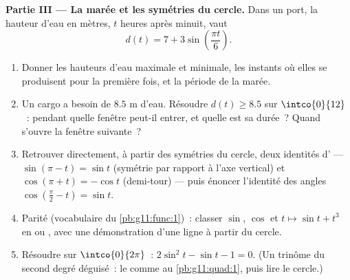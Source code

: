 \begin{problem}
\medskip
\noindent\textbf{Partie III --- La marée et les symétries du
cercle.}
Dans un port, la hauteur d'eau en mètres, $t$ heures après minuit,
vaut
\[
d(t) = 7 + 3 \sin\!\left(\frac{\pi t}{6}\right).
\]
\begin{enumerate}[resume]
  \item Donner les hauteurs d'eau maximale et minimale, les instants
        où elles se produisent pour la première fois, et la période
        de la marée.
  \item Un cargo a besoin de $8.5$ m d'eau. Résoudre
        $d(t) \geq 8.5$ sur $\intco{0}{12}$~: pendant quelle
        fenêtre peut-il entrer, et quelle est sa durée~? Quand
        s'ouvre la fenêtre suivante~?
  \item Retrouver directement, à partir des symétries du cercle,
        deux identités d' --- $\sin(\pi - t) =
        \sin t$ (symétrie par rapport à l'axe vertical) et
        $\cos(\pi + t) = -\cos t$ (demi-tour) --- puis énoncer
        l'identité des angles 
        $\cos\left(\frac\pi2 - t\right) = \sin t$.
  \item Parité (vocabulaire du \cref{pb:g11:func:1})~: classer
        $\sin$, $\cos$ et $t \mapsto \sin t + t^3$ en  ou , avec une démonstration d'une ligne à
        partir du cercle.
  \item Résoudre sur $\intco{0}{2\pi}$~:
        $2\sin^2 t - \sin t - 1 = 0$. (Un trinôme du second degré
        déguisé~: le  comme au \cref{pb:g11:quad:1}, puis
        lire le cercle.)
\end{enumerate}


\end{problem}
